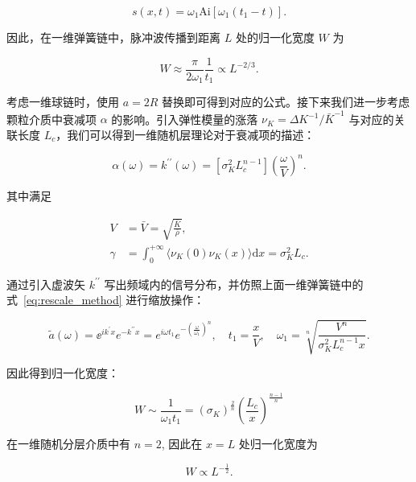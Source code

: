 \begin{equation}
  s(x,t) = \omega_{1}\text{Ai}\left[\omega_{1}(t_{1}-t)\right].
\end{equation}

因此，在一维弹簧链中，脉冲波传播到距离 $L$ 处的归一化宽度 $W$ 为

\begin{equation}
  W \approx \frac{\pi}{2\omega_{1}}\frac{1}{t_{1}}\propto L^{-2/3}.
\end{equation}

考虑一维球链时，使用 $a=2R$ 替换即可得到对应的公式\cite{PhysRevE.91.022205}。接下来我们进一步考虑颗粒介质中衰减项 $\alpha$ 的影响。引入弹性模量的涨落 $\nu_{K} = \Delta K^{-1}/\bar{K}^{-1}$ 与对应的关联长度 $L_{c}$，我们可以得到一维随机层理论对于衰减项的描述：

\begin{equation}
  \alpha(\omega) = k^{\prime\prime}(\omega) = [\sigma_{K}^{2}L_{c}^{n-1}]\left(\frac{\omega}{V}\right)^{n}.
\end{equation}

其中满足

\begin{align}
  V &= \bar{V} = \sqrt{\frac{\bar{K}}{\bar{\rho}}},\\
  \gamma &= \int_{0}^{+\infty}\langle\nu_{K}(0)\nu_{K}(x)\rangle\mathrm{d}x = \sigma_{K}^{2}L_{c}.
\end{align}

通过引入虚波矢 $k^{\prime\prime}$ 写出频域内的信号分布，并仿照上面一维弹簧链中的式~\eqref{eq:rescale_method} 进行缩放操作：

\begin{equation}
  \widetilde{a}(\omega) = {\ee}^{ik^{\prime}x}e^{-k^{\prime\prime}x} = e^{i\omega t_{1}}e^{-\left(\frac{\omega}{\omega_{1}}\right)^{n}},\quad t_{1} = \frac{x}{V},\quad \omega_{1} = \sqrt[n]{\frac{V^{n}}{\sigma_{K}^{2}L_{c}^{n-1}x}}.
\end{equation}

因此得到归一化宽度：

\begin{equation}
W\sim \frac{1}{\omega_{1}t_{1}} = (\sigma_{K})^{\frac{2}{n}}\left(\frac{L_{c}}{x}\right)^{\frac{n-1}{n}}
\end{equation}

在一维随机分层介质中有 $n=2$, 因此在 $x = L$ 处归一化宽度为

\begin{equation}
  W\propto L^{-\frac{1}{2}}.
\end{equation}


